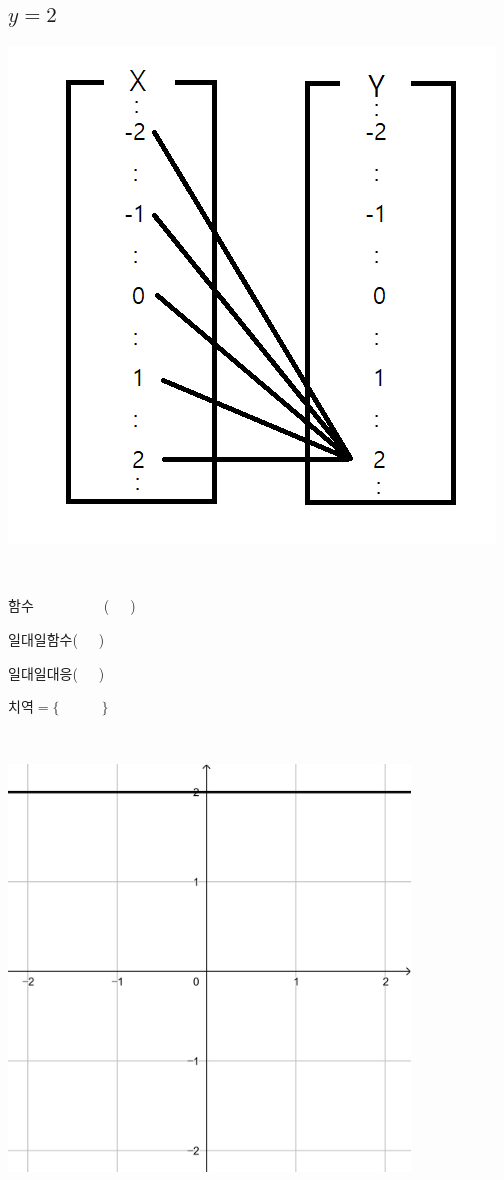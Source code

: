 \documentclass[a4paper]{oblivoir}
\begin{document}
\subsection{\(y=2\)}
%
\begin{minipage}{0.4\textwidth}
\includegraphics[width=\textwidth]{y=2}
\end{minipage}
~
\begin{minipage}{0.20\textwidth}
함수~~~~~~~~~~(~~~)\par\bigskip
일대일함수(~~~)\par\bigskip
일대일대응(~~~)\par\bigskip
치역\(=\{\qquad\quad\}\)
\end{minipage}
~
\begin{minipage}{0.35\textwidth}
\includegraphics[width=0.8\textwidth]{y=2-}
\end{minipage}
\end{document}
